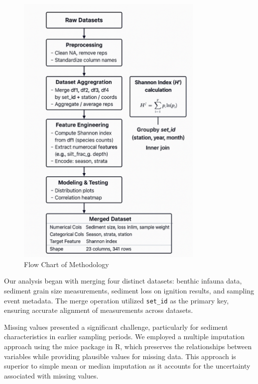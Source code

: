 \documentclass[12pt]{article}
\begin{document}
\begin{figure}[h!]
\centering
\includegraphics[width=0.8\textwidth]{flowchart.png}
\caption{Flow Chart of Methodology}
\label{fig:flowchart}
\end{figure}


\qquad Our analysis began with merging four distinct datasets: benthic infauna data, sediment grain size measurements, sediment loss on ignition results, and sampling event metadata. The merge operation utilized \texttt{set\_id} as the primary key, ensuring accurate alignment of measurements across datasets.

\qquad Missing values presented a significant challenge, particularly for sediment characteristics in earlier sampling periods. We employed a multiple imputation approach using the mice package in R, which preserves the relationships between variables while providing plausible values for missing data. This approach is superior to simple mean or median imputation as it accounts for the uncertainty associated with missing values.
\end{document}
